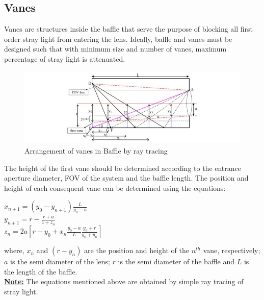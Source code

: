 \documentclass[../../main.tex]{subfiles}
\begin{document}
\subsection{Vanes}
Vanes are structures inside the baffle that serve the purpose of blocking all first order stray light from entering the lens. Ideally, baffle and vanes must be designed such that with minimum size and number of vanes, maximum percentage of stray light is attenuated.
\par
\begin{figure}[h]
    \centering
    \includegraphics[width=\textwidth]{Figures/Instrumentation/vane_arrangement.JPG}
    \caption{Arrangement of vanes in Baffle by ray tracing}
    \label{fig:8.2}
\end{figure}
The height of the first vane should be determined according to the entrance  aperture diameter, FOV of the system and the baffle length. The position and height of each consequent vane can be determined using the equations:
\begin{center}
    $x_{n+1}=(y_{0}-y_{n+1})\frac{L}{y_{0}-a}$\\
    \vspace{2em}
    $y_{n+1}=r-\frac{r+a}{1+z_{n}} $\\
    \vspace{2em}
    $z_{n}=2a[r-y_{0}+x_{n}\frac{y_{0}-a}{L}\frac{y_{0}+r}{y_{0}+y_{n}}]$
\end{center}
\par
where, $x_{n}$ and $(r-y_{n})$ are the position and height of the $n^{th}$ vane, respectively; $a$ is the semi diameter of the lens; $r$ is the semi diameter of the baffle and $L$ is the length of the baffle.\\

\textbf{\underline{Note:}} The equations mentioned above are obtained by simple ray tracing of stray light.
\end{document}

